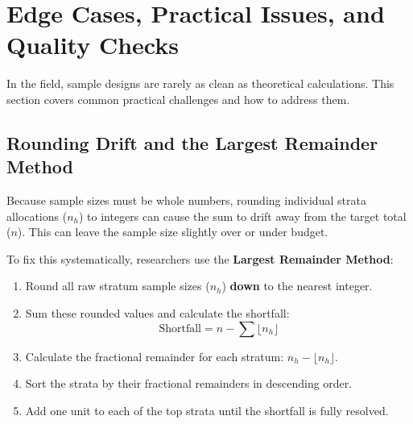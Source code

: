 \documentclass[11pt, a4paper]{article}
\begin{document}
\newpage

\section{Edge Cases, Practical Issues, and Quality Checks}

In the field, sample designs are rarely as clean as theoretical calculations. This section covers common practical challenges and how to address them.

\subsection{Rounding Drift and the Largest Remainder Method}
Because sample sizes must be whole numbers, rounding individual strata allocations ($n_h$) to integers can cause the sum to drift away from the target total ($n$). This can leave the sample size slightly over or under budget.

To fix this systematically, researchers use the \textbf{Largest Remainder Method}:
\begin{enumerate}
    \item Round all raw stratum sample sizes ($n_h$) \textbf{down} to the nearest integer.
    \item Sum these rounded values and calculate the shortfall:
    \begin{equation}
        \text{Shortfall} = n - \sum \lfloor n_h \rfloor
    \end{equation}
    \item Calculate the fractional remainder for each stratum: $n_h - \lfloor n_h \rfloor$.
    \item Sort the strata by their fractional remainders in descending order.
    \item Add one unit to each of the top strata until the shortfall is fully resolved.
\end{enumerate}
\end{document}
